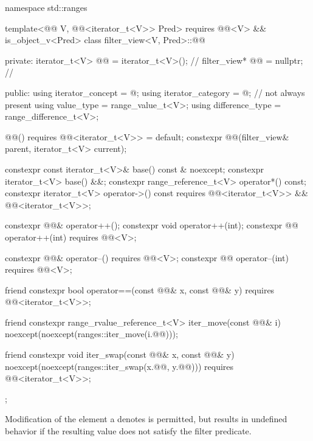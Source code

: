 %
\begin{codeblock}
namespace std::ranges {
  template<@@ V, @@<iterator_t<V>> Pred>
    requires @@<V> && is_object_v<Pred>
  class filter_view<V, Pred>::@@ {
  private:
    iterator_t<V> @@ = iterator_t<V>();   // \expos
    filter_view* @@ = nullptr;             // \expos

  public:
    using iterator_concept  = @\seebelownc@;
    using iterator_category = @\seebelownc@;        // not always present
    using value_type        = range_value_t<V>;
    using difference_type   = range_difference_t<V>;

    @@() requires @@<iterator_t<V>> = default;
    constexpr @@(filter_view& parent, iterator_t<V> current);

    constexpr const iterator_t<V>& base() const & noexcept;
    constexpr iterator_t<V> base() &&;
    constexpr range_reference_t<V> operator*() const;
    constexpr iterator_t<V> operator->() const
      requires @@<iterator_t<V>> && @@<iterator_t<V>>;

    constexpr @@& operator++();
    constexpr void operator++(int);
    constexpr @@ operator++(int) requires @@<V>;

    constexpr @@& operator--() requires @@<V>;
    constexpr @@ operator--(int) requires @@<V>;

    friend constexpr bool operator==(const @@& x, const @@& y)
      requires @@<iterator_t<V>>;

    friend constexpr range_rvalue_reference_t<V> iter_move(const @@& i)
      noexcept(noexcept(ranges::iter_move(i.@@)));

    friend constexpr void iter_swap(const @@& x, const @@& y)
      noexcept(noexcept(ranges::iter_swap(x.@@, y.@@)))
      requires @@<iterator_t<V>>;
  };
}
\end{codeblock}

\pnum
Modification of the element a  denotes is
permitted, but results in undefined behavior if the resulting value does not
satisfy the filter predicate.

